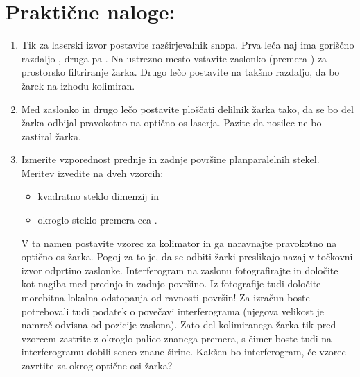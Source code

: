 \documentclass[letterpaper,10pt,english]{sphinxmanual}
\begin{document}
\section{Praktične naloge:}
\label{\detokenize{fizeau:prakticne-naloge}}\begin{enumerate}
%
\item {} 
\sphinxAtStartPar
Tik za laserski izvor postavite razširjevalnik snopa. Prva leča naj ima goriščno razdaljo , druga pa \sphinxstyleemphasis{150 mm}. Na ustrezno mesto vstavite zaslonko (premera ) za prostorsko filtriranje žarka. Drugo lečo postavite na takšno razdaljo, da bo žarek na izhodu kolimiran.

\item {} 
\sphinxAtStartPar
Med zaslonko in drugo lečo postavite ploščati delilnik žarka tako, da se bo del žarka odbijal pravokotno na optično os laserja. Pazite da nosilec ne bo zastiral žarka.

\item {} 
\sphinxAtStartPar
Izmerite vzporednost prednje in zadnje površine planparalelnih stekel. Meritev izvedite na dveh vzorcih:
\begin{itemize}
\item {} 
\sphinxAtStartPar
kvadratno steklo dimenzij  in

\item {} 
\sphinxAtStartPar
okroglo steklo premera cca \sphinxstyleemphasis{40 mm}.

\end{itemize}

\sphinxAtStartPar
V ta namen postavite vzorec za kolimator in ga naravnajte pravokotno na optično os žarka. Pogoj za to je, da se odbiti žarki preslikajo nazaj v točkovni izvor \sphinxhyphen{} odprtino zaslonke. Interferogram na zaslonu fotografirajte in določite kot nagiba med prednjo in zadnjo površino. Iz fotografije tudi določite morebitna lokalna odstopanja od ravnosti površin! Za izračun boste potrebovali tudi podatek o povečavi interferograma (njegova velikost je namreč odvisna od pozicije zaslona). Zato del kolimiranega žarka tik pred vzorcem zastrite z okroglo palico znanega premera, s čimer boste tudi na interferogramu dobili senco znane širine. Kakšen bo interferogram, če vzorec zavrtite za  okrog optične osi žarka?


\end{enumerate}
\end{document}
